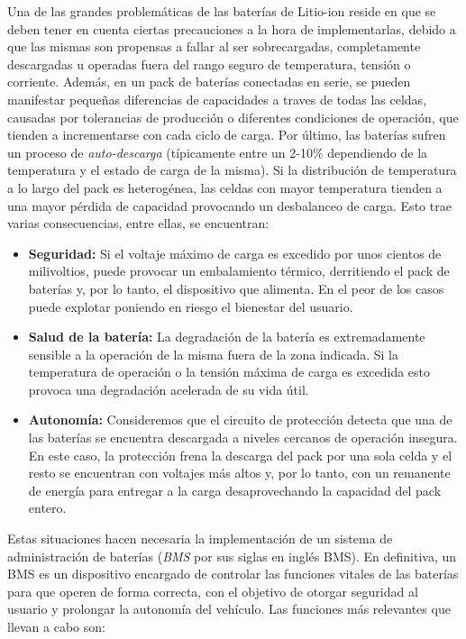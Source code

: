 \documentclass[10pt, a4paper]{report}
\begin{document}
\noindent Una de las grandes problem\'aticas de las bater\'ias de Litio-ion 
reside en que se deben tener en cuenta ciertas precauciones a la hora de
implementarlas, debido a que las mismas son propensas a fallar al ser 
sobrecargadas, completamente descargadas u operadas fuera del
rango seguro de temperatura, tensi\'on o corriente. Adem\'as, en un pack de 
bater\'ias conectadas en serie, se pueden manifestar pequeñas diferencias de 
capacidades a traves de todas las celdas, causadas por tolerancias de
producci\'on o diferentes condiciones de operaci\'on, que tienden
a incrementarse con cada ciclo de carga. Por \'ultimo, las bater\'ias
sufren un proceso de \emph{auto-descarga} (t\'ipicamente entre un
2-10\% dependiendo de la temperatura y el estado de carga de la misma). 
Si la distribuci\'on de temperatura a lo largo del pack es
heterog\'enea, las celdas con mayor temperatura tienden a una mayor
p\'erdida de capacidad provocando un desbalanceo de carga.
Esto trae varias consecuencias, entre ellas, se encuentran:

\begin{itemize}
    \item \textbf{Seguridad:} Si el voltaje máximo de carga es excedido por 
        unos cientos de milivoltios, puede provocar un embalamiento térmico, 
        derritiendo el pack de baterías y, por lo tanto, el dispositivo que 
        alimenta. En el peor de los casos puede explotar poniendo en riesgo el 
        bienestar del usuario.
    \item \textbf{Salud de la batería:} La degradación de la batería es 
        extremadamente sensible a la operación de la misma fuera de la zona 
        indicada. Si la temperatura de operación o la tensión máxima de carga 
        es excedida esto provoca una degradación acelerada de su vida 
        útil.
    \item \textbf{Autonomía:} Consideremos que el circuito de protección 
        detecta que una de las baterías se encuentra descargada a niveles 
        cercanos de operación insegura. En este caso, la protección frena la 
        descarga del pack por una sola celda y el resto se encuentran con 
        voltajes más altos y, por lo tanto, con un remanente de energía para 
        entregar a la carga desaprovechando la capacidad del pack entero.
\end{itemize}

Estas situaciones hacen necesaria la implementación de un sistema de
administración de baterías (\emph{\acrshort{BMS}} por sus siglas en inglés
\acrlong{BMS}). En definitiva, un \acrshort{BMS} es un dispositivo encargado de
controlar las funciones vitales de las baterías para que operen de forma
correcta, con el objetivo de otorgar seguridad al usuario y prolongar
la autonomía del vehículo. Las funciones más relevantes que llevan a cabo son:
\end{document}
